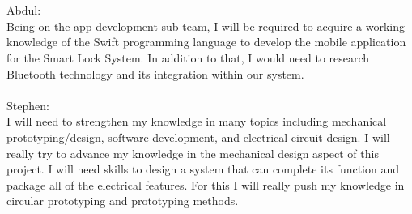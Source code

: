 \documentclass[12pt]{article}
\begin{document}
\begin{enumerate}
  \\
\\
Abdul:
\\ 
 Being on the app development sub-team, I will be required to acquire a working knowledge of the Swift programming language to develop the mobile application for the Smart Lock System.  In addition to that, I would need to research Bluetooth technology and its integration within our system.
 \\
\\
Stephen:
\\
 I will need to strengthen my knowledge in many topics including mechanical prototyping/design, software development, and electrical circuit design.  I will really try to advance my knowledge in the mechanical design aspect of this project.  I will need skills to design a system that can complete its function and package all of the electrical features.  For this I will really push my knowledge in circular prototyping and prototyping methods.
 

\end{enumerate}
\end{document}
